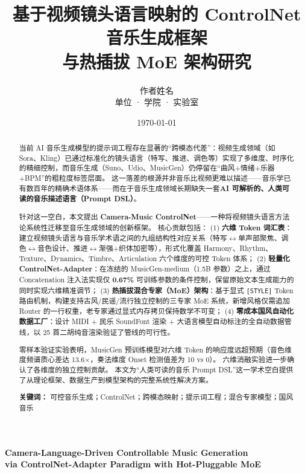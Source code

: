 \documentclass[UTF8,12pt,a4paper]{ctexart}
\title{\bfseries 基于视频镜头语言映射的 ControlNet 音乐生成框架\\与热插拔 MoE 架构研究}
\author{作者姓名\footnotemark[1] \\
{\small 单位 · 学院 · 实验室}}
\date{\today}
\begin{document}
\maketitle

\begin{center}
\large\textbf{Camera-Language-Driven Controllable Music Generation\\via ControlNet-Adapter Paradigm with Hot-Pluggable MoE}
\end{center}

\begin{abstract}
\noindent
当前 AI 音乐生成模型的提示词工程存在显著的“跨模态代差”：视频生成领域（如 Sora、Kling）已通过标准化的镜头语言（特写、推进、调色等）实现了多维度、时序化的精细控制，而音乐生成（Suno、Udio、MusicGen）仍停留在“曲风+情绪+乐器+BPM”的粗粒度标签层面。
这一落差的根源并非音乐比视频更难以描述——音乐学已有数百年的精确术语体系——而在于音乐生成领域长期缺失一套\textbf{AI 可解析的、人类可读的音乐描述语言（Prompt DSL）}。

针对这一空白，本文提出 \textbf{Camera-Music ControlNet}——一种将视频镜头语言方法论系统性迁移至音乐生成领域的创新框架。
核心贡献包括：
(1) \textbf{六维 Token 词汇表}：建立视频镜头语言与音乐学术语之间的九组结构性对应关系（特写$\leftrightarrow$单声部聚焦、调色$\leftrightarrow$音色设计、推进$\leftrightarrow$渐强+织体加密等），形式化覆盖 Harmony、Rhythm、Texture、Dynamics、Timbre、Articulation 六个维度的可控 Token 体系；
(2) \textbf{轻量化 ControlNet-Adapter}：在冻结的 MusicGen-medium（1.5B 参数）之上，通过 Concatenation 注入法实现仅 \textbf{0.67\%} 可训练参数的条件控制，保留原始文本生成能力的同时实现六维精准调节；
(3) \textbf{热插拔混合专家（MoE）架构}：基于显式 \texttt{[STYLE]} Token 路由机制，构建支持古风/民谣/流行独立控制的三专家 MoE 系统，新增风格仅需追加 Router 的一行权重，老专家通过显式内存拷贝保持数学不可变；
(4) \textbf{零成本国风自动化数据工厂}：设计 MIDI + 民乐 SoundFont 渲染 + 大语言模型自动标注的全自动数据管线，以 25 首二胡纯音渲染验证了管线的可行性。

零样本验证实验表明，MusicGen 预训练模型对六维 Token 的响应度远超预期（音色维度频谱质心差达 13.6$\times$，奏法维度 Onset 检测值差为 10 vs 0）。
六维消融实验进一步确认了各维度的独立控制贡献。
本文为“人类可读的音乐 Prompt DSL”这一学术空白提供了从理论框架、数据生产到模型架构的完整系统性解决方案。

\vspace{6pt}
\noindent\textbf{关键词：} 可控音乐生成；ControlNet；跨模态映射；提示词工程；混合专家模型；国风音乐
\end{abstract}
\end{document}
